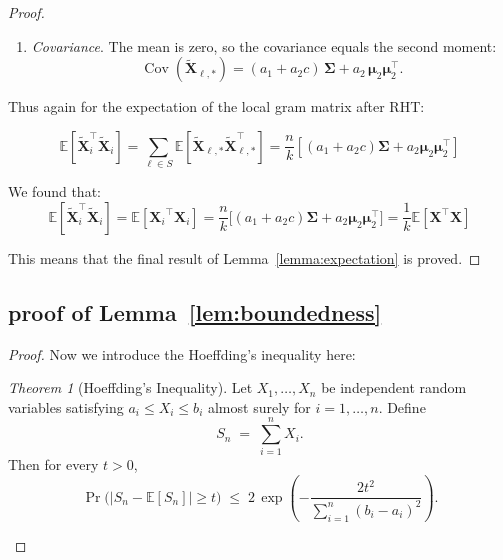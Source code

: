 \documentclass[11pt]{article}
\numberwithin{equation}{section}
\theoremstyle{plain}
\theoremstyle{definition}
\theoremstyle{remark}
\newtheorem{thm}[theorem]{Theorem}
\begin{document}
\begin{appendix}
\begin{proof}
\begin{enumerate}
         \item \textit{Covariance}.
             The mean is zero, so the covariance equals the second moment:
             \[
             \operatorname{Cov}(\mathbf{\tilde{X}}_{\ell,\ast})
           = (a_{1}+a_{2}c)\,\mathbf{\Sigma}
           + a_{2}\,\boldsymbol{\mu}_{2}\boldsymbol{\mu}_{2}^{\top}.
             \]
         \end{enumerate}

         Thus again for the expectation of the local gram matrix after RHT:

         \begin{equation*}
         \mathbb{E}[\mathbf{\tilde{X}}_i^{\top}\mathbf{\tilde{X}}_i]
           = \sum_{\ell \in S} \mathbb{E}[\mathbf{\tilde{X}}_{\ell,\ast}\mathbf{\tilde{X}}_{\ell,\ast}^{\top}]
           = \frac{n}{k}\left[(a_{1}+a_{2}c)\mathbf{\Sigma} + a_{2}\boldsymbol{\mu}_{2}\boldsymbol{\mu}_{2}^{\top}\right]
         \end{equation*}

         We found that:
         \small
         \[
         \mathbb{E}[\mathbf{\tilde{X}}_i^{\top}\mathbf{\tilde{X}}_i]
           =\mathbb{E}[{\mathbf{X}_i}^{\top}{\mathbf{X}_i}]
           =\frac{n}{k}\bigl[(a_{1}+a_{2}c)\mathbf{\Sigma}+a_{2}\boldsymbol{\mu}_{2}\boldsymbol{\mu}_{2}^{\top}\bigr]
           = \frac{1}{k} \mathbb{E}[\mathbf{X}^{\top} \mathbf{X}]
         \]
         \normalsize

         This means that the final result of Lemma~\ref{lemma:expectation} is proved.

      \end{proof}




      \subsection{proof of Lemma~\ref{lem:boundedness}}

\begin{proof}
Now we introduce the Hoeffding's inequality here:

\begin{thm}[Hoeffding’s Inequality]
    Let \(X_1,\dots,X_n\) be independent random variables satisfying
    \(a_i \le X_i \le b_i\) almost surely for \(i=1,\dots,n\).
    Define
    \[
    S_n \;=\; \sum_{i=1}^{n} X_i .
    \]
    Then for every \(t>0\),
    \[
    \Pr\!\bigl(|S_n - \mathbb{E}[S_n]| \ge t\bigr)
       \;\le\;
       2\,\exp\!\left(
            -\frac{2t^{2}}{\displaystyle\sum_{i=1}^{n}(b_i-a_i)^{2}}
       \right).
    \]
    \end{thm}


\end{proof}
\end{appendix}
\end{document}
